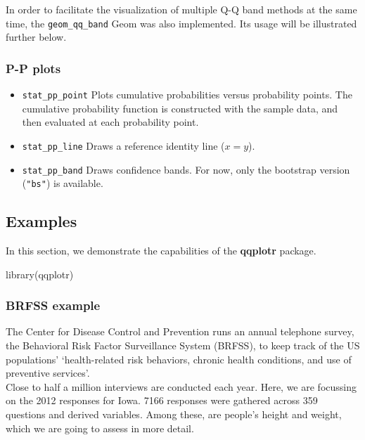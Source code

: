 In order to facilitate the visualization of multiple Q-Q band methods at
the same time, the \texttt{geom\_qq\_band} Geom was also implemented.
Its usage will be illustrated further below.

\subsubsection{P-P plots}\label{p-p-plots}

\begin{itemize}
\tightlist
\item
  \texttt{stat\_pp\_point} Plots cumulative probabilities versus
  probability points. The cumulative probability function is constructed
  with the sample data, and then evaluated at each probability point.
\item
  \texttt{stat\_pp\_line} Draws a reference identity line (\(x = y\)).
\item
  \texttt{stat\_pp\_band} Draws confidence bands. For now, only the
  bootstrap version (\texttt{"bs"}) is available.
\end{itemize}

\subsection{Examples}\label{examples}

In this section, we demonstrate the capabilities of the \textbf{qqplotr}
package.

\begin{Schunk}
\begin{Sinput}
library(qqplotr)
\end{Sinput}
\end{Schunk}

\subsubsection{BRFSS example}\label{brfss-example}

The Center for Disease Control and Prevention runs an annual telephone
survey, the Behavioral Risk Factor Surveillance System (BRFSS), to keep
track of the US populations' `health-related risk behaviors, chronic
health conditions, and use of preventive services'.\\
Close to half a million interviews are conducted each year. Here, we are
focussing on the 2012 responses for Iowa. 7166 responses were gathered
across 359 questions and derived variables. Among these, are people's
height and weight, which we are going to assess in more detail.

